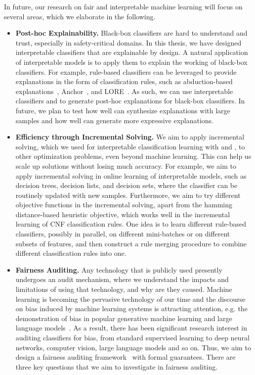 In future, our research on fair and interpretable machine learning will focus on several areas, which we elaborate in the following.

\begin{itemize}
	\item 
	\textbf{Post-hoc Explainability.} Black-box classifiers are hard to understand and trust, especially in safety-critical domains. In this thesis, we have designed interpretable classifiers that are explainable by design. A natural application of interpretable models is to apply them to explain the working of black-box classifiers. For example, rule-based classifiers can be leveraged to provide explanations in the form of classification rules, such as abduction-based explanations~\cite{ignatiev2019abduction}, Anchor~\cite{ribeiro2018anchors}, and LORE~\cite{guidotti2018local}. As such, we can use interpretable classifiers {\imli} and {\crr} to generate post-hoc explanations for black-box classifiers.  In future, we plan to test how well {\imli} can synthesize explanations with large samples and how well {\crr} can generate more expressive explanations.
	
	
	\item \textbf{Efficiency through Incremental Solving.} We aim to apply incremental solving, which we used for interpretable classification learning with {\imli} and {\crr}, to other optimization problems, even beyond machine learning. This can help us scale up solutions without losing much accuracy. For example, we aim to apply incremental solving in online learning of interpretable models, such as decision trees, decision lists, and decision sets, where the classifier can be routinely updated with new samples. Furthermore, we aim to try different objective functions in the incremental solving, apart from the hamming distance-based heuristic objective, which  works well in the incremental learning of CNF classification rules. One idea is to learn different rule-based classifiers, possibly in parallel, on different mini-batches or on different subsets of features, and then construct a rule merging procedure to combine different classification rules into one.  
	
	
	\item \textbf{Fairness Auditing.} Any technology that is publicly used presently undergoes an audit mechanism, where we understand the impacts and limitations of using that technology, and why are they caused. Machine learning is becoming the pervasive technology of our time and the discourse on bias induced by machine learning systems is attracting attention, e.g. the demonstration of bias in popular generative machine learning and large language models~\cite{abid2021persistent,nadeem2020stereoset,vig2020investigating}. As a result, there has been significant research interest in auditing classifiers for bias, from standard supervised learning to deep neural networks, computer vision, large language models and so on. Thus, we aim to design a fairness auditing framework~\cite{ruf2021towards,yan2022active} with formal guarantees.  There are three key questions that we aim to investigate in fairness auditing.
	

\end{itemize}
